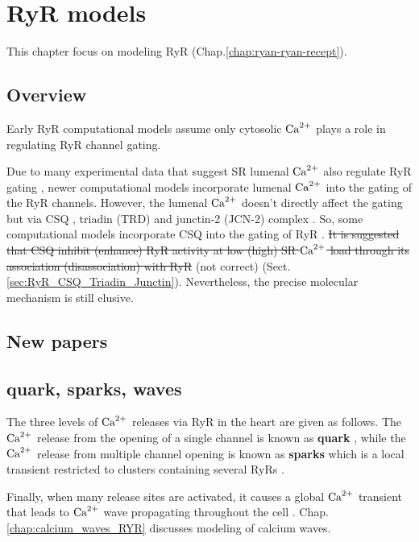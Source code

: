 \chapter{RyR models}
\label{chap:ryr-models}

This chapter focus on modeling RyR (Chap.\ref{chap:ryan-ryan-recept}).

\section{Overview}

Early RyR computational models assume only cytosolic ${\text{Ca}^{2+}}$ plays a role in
regulating RyR channel gating. 

Due to many experimental data that suggest SR lumenal ${\text{Ca}^{2+}}$ also regulate RyR
gating \citep{gyorke1998, ching2000}, newer computational models incorporate
lumenal ${\text{Ca}^{2+}}$ into the gating of the RyR channels. However, the lumenal ${\text{Ca}^{2+}}$
doesn't directly affect the gating but via CSQ , triadin (TRD) and junctin-2
(JCN-2) complex \citep{Gyorke2004, Gyorke2004a}. So, some computational models
incorporate CSQ into the gating of RyR \citep{Lee2008, tania2010}.  \sout{It is
suggested that CSQ inhibit (enhance) RyR activity at low (high) SR ${\text{Ca}^{2+}}$ load
through its association (disassociation) with RyR} (not correct)
(Sect.\ref{sec:RyR_CSQ_Triadin_Junctin}). Nevertheless, the precise molecular
mechanism is still elusive.

\section{New papers}

\citep{uehara2002, zucchi1997} 

\section{quark, sparks, waves}
\label{sec:calcium-release-RyR}

The three levels of ${\text{Ca}^{2+}}$ releases via RyR in the heart are given as follows.
The ${\text{Ca}^{2+}}$ release from the opening of a single channel is known as {\bf quark}
\citep{brochet2011}, while the ${\text{Ca}^{2+}}$ release from multiple channel opening is
known as {\bf sparks} which is a local transient restricted to clusters
containing several RyRs \citep{Cheng1993Calciumspark}.

Finally, when many release sites are activated, it causes a global ${\text{Ca}^{2+}}$
transient that leads to ${\text{Ca}^{2+}}$ wave propagating throughout the cell
\citep{cheng1996csc}.  Chap.\ref{chap:calcium_waves_RYR} discusses
modeling of calcium waves.


